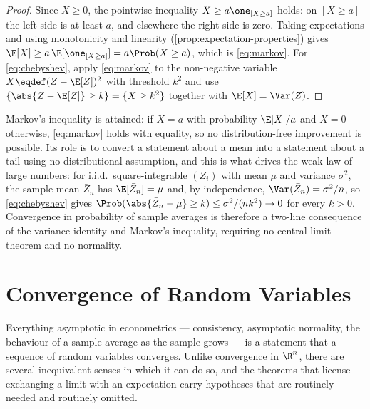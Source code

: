 \begin{proof}
	Since $X\geq0$, the pointwise inequality $X\geq a\one_{[X\geq a]}$ holds:
	on $[X\geq a]$ the left side is at least $a$, and elsewhere the right side is
	zero. Taking expectations and using monotonicity and linearity
	(\autoref{prop:expectation-properties}) gives
	$\E[X]\geq a\,\E[\one_{[X\geq a]}]=a\Prob(X\geq a)$, which is
	\eqref{eq:markov}. For \eqref{eq:chebyshev}, apply \eqref{eq:markov} to the
	non-negative variable $X\eqdef(Z-\E[Z])^{2}$ with threshold $k^{2}$ and use
	$\{\abs{Z-\E[Z]}\geq k\}=\{X\geq k^{2}\}$ together with $\E[X]=\Var(Z)$.
\end{proof}

\begin{remark}\label{rem:markov-sharp}
	Markov's inequality is attained: if $X=a$ with probability $\E[X]/a$ and $X=0$
	otherwise, \eqref{eq:markov} holds with equality, so no distribution-free
	improvement is possible. Its role is to convert a statement about a mean into a
	statement about a tail using no distributional assumption, and this is what
	drives the weak law of large numbers: for i.i.d.\ square-integrable
	$(Z_i)$ with mean $\mu$ and variance $\sigma^{2}$, the sample mean
	$\bar Z_n$ has $\E[\bar Z_n]=\mu$ and, by independence,
	$\Var(\bar Z_n)=\sigma^{2}/n$, so \eqref{eq:chebyshev} gives
	$\Prob(\abs{\bar Z_n-\mu}\geq k)\leq\sigma^{2}/(nk^{2})\to0$ for every $k>0$.
	Convergence in probability of sample averages is therefore a two-line
	consequence of the variance identity and Markov's inequality, requiring no
	central limit theorem and no normality.
\end{remark}

\section{Convergence of Random Variables}\label{sec:prob-convergence}

Everything asymptotic in econometrics --- consistency, asymptotic normality, the
behaviour of a sample average as the sample grows --- is a statement that a
sequence of random variables converges. Unlike convergence in $\R^n$, there are
several inequivalent senses in which it can do so, and the theorems that license
exchanging a limit with an expectation carry hypotheses that are routinely
needed and routinely omitted.


